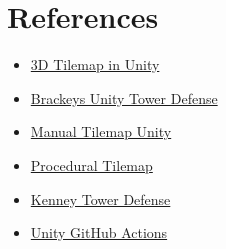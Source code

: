 \documentclass{article}
\begin{document}
\section{References}
\label{References}

\begin{itemize}
    \item \href{https://youtu.be/ulFc6p3hQzQ}{3D Tilemap in Unity}
    \item \href{https://www.youtube.com/playlist?list=PLPV2KyIb3jR4u5jX8za5iU1cqnQPmbzG0}{Brackeys Unity Tower Defense}
    \item \href{https://forum.unity.com/threads/how-can-i-place-a-tile-in-a-tilemap-by-script.508338/}{Manual Tilemap Unity}
    \item \href{https://blog.unity.com/technology/procedural-patterns-you-can-use-with-tilemaps-part-i}{Procedural Tilemap}
    \item \href{https://www.kenney.nl/assets/tower-defense-kit}{Kenney Tower Defense}
    \item \href{https://isaacbroyles.com/gamedev/2020/07/04/unity-github-actions.html}{Unity GitHub Actions}
\end{itemize}
\end{document}
